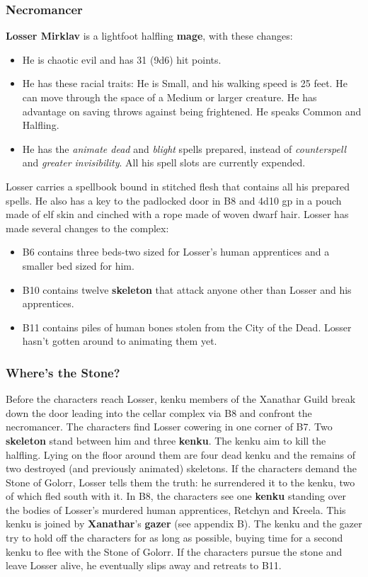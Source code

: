 \documentclass[10pt,a4paper,twoside,twocolumn,openany,nodeprecatedcode]{dndbook}
\begin{document}
\subsubsection{Necromancer}
\textbf{Losser Mirklav} is a lightfoot halfling \textbf{mage}, with these changes:
\begin{itemize}

\item He is chaotic evil and has 31 (9d6) hit points.
\item He has these racial traits: He is Small, and his walking speed is 25 feet. He can move through the space of a Medium or larger creature. He has advantage on saving throws against being frightened. He speaks Common and Halfling.
\item He has the \textit{animate dead} and \textit{blight} spells prepared, instead of \textit{counterspell} and \textit{greater invisibility}. All his spell slots are currently expended.
\end{itemize}


Losser carries a spellbook bound in stitched flesh that contains all his prepared spells. He also has a key to the padlocked door in B8 and 4d10 gp in a pouch made of elf skin and cinched with a rope made of woven dwarf hair.
Losser has made several changes to the complex:
\begin{itemize}

\item B6 contains three beds-two sized for Losser's human apprentices and a smaller bed sized for him.
\item B10 contains twelve \textbf{skeleton} that attack anyone other than Losser and his apprentices.
\item B11 contains piles of human bones stolen from the City of the Dead. Losser hasn't gotten around to animating them yet.
\end{itemize}


\subsubsection{Where's the Stone?}
Before the characters reach Losser, kenku members of the Xanathar Guild break down the door leading into the cellar complex via B8 and confront the necromancer. The characters find Losser cowering in one corner of B7. Two \textbf{skeleton} stand between him and three \textbf{kenku}. The kenku aim to kill the halfling. Lying on the floor around them are four dead kenku and the remains of two destroyed (and previously animated) skeletons.
If the characters demand the Stone of Golorr, Losser tells them the truth: he surrendered it to the kenku, two of which fled south with it. In B8, the characters see one \textbf{kenku} standing over the bodies of Losser's murdered human apprentices, Retchyn and Kreela. This kenku is joined by \textbf{Xanathar}'s \textbf{gazer} (see appendix B). The kenku and the gazer try to hold off the characters for as long as possible, buying time for a second kenku to flee with the Stone of Golorr.
If the characters pursue the stone and leave Losser alive, he eventually slips away and retreats to B11.
\end{document}
